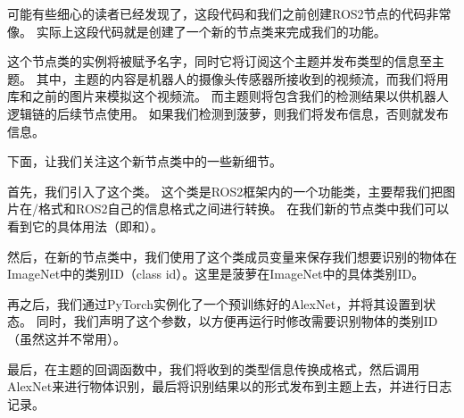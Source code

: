 \documentclass[letterpaper,10pt,english]{sphinxmanual}
\begin{document}
\sphinxAtStartPar
可能有些细心的读者已经发现了，这段代码和我们之前创建ROS2节点的代码非常像。
实际上这段代码就是创建了一个新的节点类来完成我们的功能。

\sphinxAtStartPar
这个节点类的实例将被赋予名字，同时它将订阅这个主题并发布类型的信息至主题。
其中，主题的内容是机器人的摄像头传感器所接收到的视频流，而我们将用库和之前的图片来模拟这个视频流。
而主题则将包含我们的检测结果以供机器人逻辑链的后续节点使用。
如果我们检测到菠萝，则我们将发布信息，否则就发布信息。

\sphinxAtStartPar
下面，让我们关注这个新节点类中的一些新细节。

\sphinxAtStartPar
首先，我们引入了这个类。
这个类是ROS2框架内的一个功能类，主要帮我们把图片在/格式和ROS2自己的信息格式之间进行转换。
在我们新的节点类中我们可以看到它的具体用法（即和）。

\sphinxAtStartPar
然后，在新的节点类中，我们使用了这个类成员变量来保存我们想要识别的物体在ImageNet中的类别ID（class
id）。这里是菠萝在ImageNet中的具体类别ID。

\sphinxAtStartPar
再之后，我们通过PyTorch实例化了一个预训练好的AlexNet，并将其设置到状态。
同时，我们声明了这个参数，以方便再运行时修改需要识别物体的类别ID（虽然这并不常用）。

\sphinxAtStartPar
最后，在主题的回调函数中，我们将收到的类型信息传换成格式，然后调用AlexNet来进行物体识别，最后将识别结果以的形式发布到主题上去，并进行日志记录。
\end{document}
